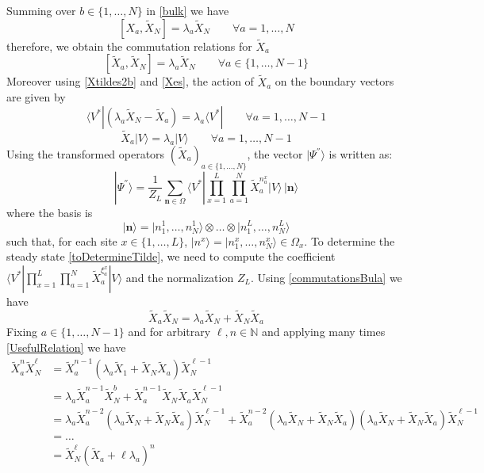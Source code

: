 \documentclass[10pt]{article}
\numberwithin{equation}{section}
\numberwithin{equation}{subsection}
\newcommand{\Xt}{\tilde{X}}
\begin{document}
Summing over $b\in \{1,\ldots,N\}$ in \eqref{bulk} we have
\begin{equation} 
	\left[X_{a},\Xt_{N}\right]=\lambda_{a}\Xt_{N}\qquad\forall a=1,\ldots,N
\end{equation}
therefore, we obtain the commutation relations for $\Xt_{a}$ 
\begin{equation}\label{commutationsBula}
	\left[\Xt_{a},\Xt_{N}\right]=\lambda_{a}\Xt_{N}\qquad \forall a\in \{1,\ldots,N-1\}
\end{equation}
Moreover using \eqref{Xtildes2b} and \eqref{Xes}, the action of $\Xt_{a}$ on the boundary vectors are given by 
\begin{equation}\label{commLEFT}
	\langle V^{*}|\left(\lambda_{a}\Xt_{N}-\Xt_{a}\right)=\lambda_{a}\langle V^{*}|\qquad\forall a=1,\ldots,N-1
\end{equation}
\begin{equation}\label{commRIGHT}
	\Xt_{a} |V\rangle= \lambda_{a}|V\rangle\qquad\forall a=1,\ldots,N-1
\end{equation} 
Using the transformed operators $(\widetilde{X}_{a})_{a\in\{1,\ldots,N\}}$, the vector $|\Psi^{''}\rangle$ is written as:
\begin{equation}\label{toDetermineTilde}
	|\Psi^{''}\rangle = \frac{1}{Z_{L}}\sum_{\bm{n}\in \Omega}\langle V^{*}|\prod_{x=1}^{L}\prod_{a=1}^{N}\widetilde{X}_{a}^{n_{a}^{x}}
	|V \rangle \,|\bm{n}\rangle
\end{equation}
where the basis is 
$$
|\bm{n}\rangle =|n_{1}^{1},\ldots,n_{N}^{1}\rangle \otimes \ldots\otimes |n_{1}^{L},\ldots,n_{N}^{L}\rangle
$$
such that, for each site $x\in \{1,\ldots,L\}$, $|n^{x}\rangle=|n_{1}^{x},\ldots,n_{N}^{x}\rangle\in \Omega_{x}$. 
To determine the steady state \eqref{toDetermineTilde}, we need to compute the coefficient $\langle V^{*}|\prod_{x=1}^{L}\prod_{a=1}^{N}\widetilde{X}_{a}^{\xi_{a}^{x}}
|V \rangle$ and the normalization $Z_{L}$. Using \eqref{commutationsBula} we have
\begin{equation}\label{UsefulRelation}
	\widetilde{X}_{a}\widetilde{X}_{N}=\lambda_{a}\widetilde{X}_{N}+\widetilde{X}_{N}\widetilde{X}_{a}
\end{equation}
Fixing $ a\in \{1,\ldots,N-1\}$ and for arbitrary $ \ell,n\in \mathbb{N}$ and applying many times \eqref{UsefulRelation} we have
\begin{align*}
	\widetilde{X}_{a}^{n}\widetilde{X}_{N}^{\ell}&=\widetilde{X}_{a}^{n-1}\left(\lambda_{a}\widetilde{X}_{1}+\widetilde{X}_{N}\widetilde{X}_{a}\right)\widetilde{X}_{N}^{\ell-1}
	\\&=\lambda_{a}\widetilde{X}_{a}^{n-1}\widetilde{X}_{N}^{b}+\widetilde{X}_{a}^{n-1}\widetilde{X}_{N}\widetilde{X}_{a}\widetilde{X}_{N}^{\ell-1}
	\\&=
	\lambda_{a}\widetilde{X}_{a}^{n-2}\left(\lambda_{a}\widetilde{X}_{N}+\widetilde{X}_{N}\widetilde{X}_{a}\right)\widetilde{X}_{N}^{\ell-1}+\widetilde{X}_{a}^{n-2}\left(\lambda_{a}\widetilde{X}_{N}+\widetilde{X}_{N}\widetilde{X}_{a}\right)\left(\lambda_{a}\widetilde{X}_{N}+\widetilde{X}_{N}\widetilde{X}_{a}\right)\widetilde{X}_{N}^{\ell -1}
	\\&=\ldots\\&=
	\widetilde{X}_{N}^{\ell}\left(\widetilde{X}_{a}+\ell\lambda_{a}\right)^{n}
\end{align*}
\end{document}
